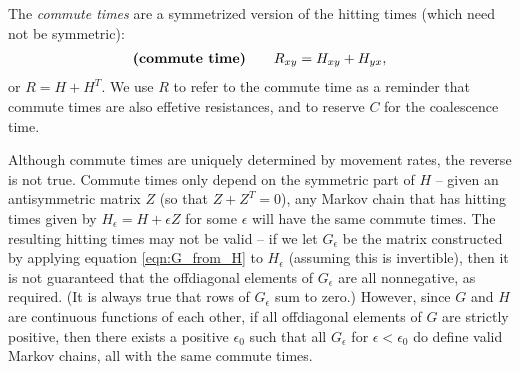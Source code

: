 \documentclass{article}
\begin{document}
The \emph{commute times} are a symmetrized version of the hitting times
(which need not be symmetric):
\begin{align} \label{eqn:R_from_H}
\text{\bf (commute time)} \qquad
    R_{xy} = H_{xy} + H_{yx},
\end{align}
or $R = H + H^T$.
We use $R$ to refer to the commute time as a reminder that commute times are also effetive resistances,
and to reserve $C$ for the coalescence time.

Although commute times are uniquely determined by movement rates, the reverse is not true.
Commute times only depend on the symmetric part of $H$ --
given an antisymmetric matrix $Z$ (so that $Z + Z^T = 0$),
any Markov chain that has hitting times given by $H_\epsilon = H + \epsilon Z$ for some $\epsilon$
will have the same commute times.
The resulting hitting times may not be valid --
if we let $G_\epsilon$ be the matrix constructed by applying equation \eqref{eqn:G_from_H} to $H_\epsilon$
(assuming this is invertible),
then it is not guaranteed that the offdiagonal elements of $G_\epsilon$ are all nonnegative, as required.
(It is always true that rows of $G_\epsilon$ sum to zero.)
However, since $G$ and $H$ are continuous functions of each other,
if all offdiagonal elements of $G$ are strictly positive,
then there exists a positive $\epsilon_0$ such that all $G_\epsilon$ for $\epsilon < \epsilon_0$
do define valid Markov chains, all with the same commute times.
\end{document}
